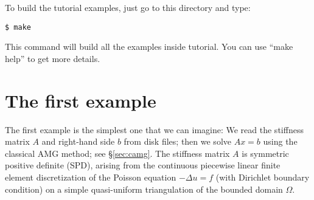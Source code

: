 \documentclass[11pt]{memoir}
\begin{document}
To build the tutorial examples, just go to this directory and type:
%
\begin{lstlisting}[numbers=none]
$ make
\end{lstlisting}
%
This command will build all the examples inside tutorial. You can use ``make help'' to get more details. 


\section{The first example}\label{sec:ex1}

The first example is the simplest one that we can imagine: We read the stiffness matrix $A$ and right-hand side $b$ from disk files; then we solve $Ax=b$ using the classical AMG method; see \S\ref{sec:camg}. The stiffness matrix $A$ is symmetric positive definite (SPD), arising from the continuous piecewise linear finite element discretization of the Poisson equation $-\Delta u = f$ (with Dirichlet boundary condition) on a simple quasi-uniform triangulation of the bounded domain $\Omega$. 
 
\end{document}
